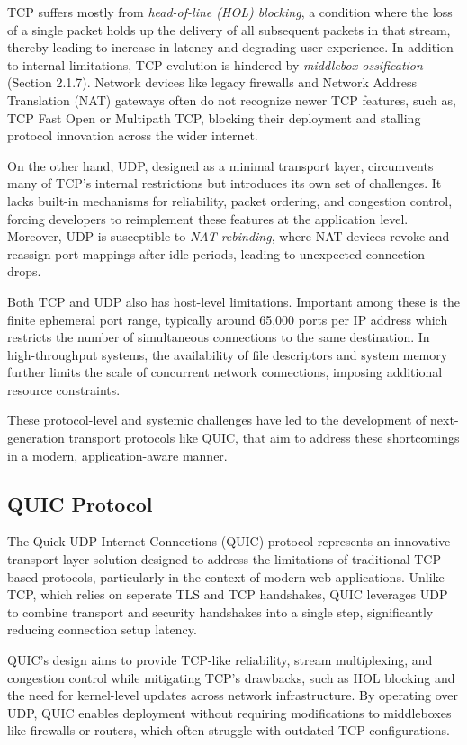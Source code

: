 TCP suffers mostly from \textit{head-of-line (HOL) blocking}, a condition where the loss of a single packet holds up the delivery of all subsequent packets in that stream, thereby leading to increase in latency and degrading user experience. In addition to internal limitations, TCP evolution is hindered by \textit{middlebox ossification} (Section 2.1.7). Network devices like legacy firewalls and Network Address Translation (NAT) gateways often do not recognize newer TCP features, such as, TCP Fast Open or Multipath TCP, blocking their deployment and stalling protocol innovation across the wider internet.

On the other hand, UDP, designed as a minimal transport layer, circumvents many of TCP’s internal restrictions but introduces its own set of challenges. It lacks built-in mechanisms for reliability, packet ordering, and congestion control, forcing developers to reimplement these features at the application level. Moreover, UDP is susceptible to \textit{NAT rebinding}, where NAT devices revoke and reassign port mappings after idle periods, leading to unexpected connection drops.

Both TCP and UDP also has  host-level limitations. Important among these is the finite ephemeral port range, typically around 65,000 ports per IP address which restricts the number of simultaneous connections to the same destination. In high-throughput systems, the availability of file descriptors and system memory further limits the scale of concurrent network connections, imposing additional resource constraints.

These protocol-level and systemic challenges have led to the development of next-generation transport protocols like QUIC, that aim to address these shortcomings in a modern, application-aware manner.

\subsection{QUIC Protocol}

The Quick UDP Internet Connections (QUIC) protocol represents an innovative transport layer solution designed to address the limitations of traditional TCP-based protocols, particularly in the context of modern web applications. Unlike TCP, which relies on seperate TLS and TCP handshakes, QUIC leverages UDP to combine transport and security handshakes into a single step, significantly reducing connection setup latency.

QUIC’s design aims to provide TCP-like reliability, stream multiplexing, and congestion control  while mitigating TCP’s drawbacks, such as HOL blocking and the need for kernel-level updates across network infrastructure. By operating over UDP, QUIC enables deployment without requiring modifications to middleboxes like firewalls or routers, which often struggle with outdated TCP configurations. 

